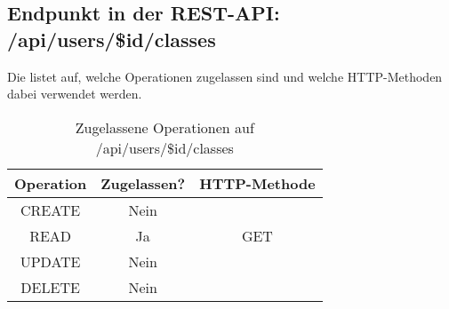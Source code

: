 \subsection{Endpunkt in der REST-API: /api/users/\$id/classes}
Die  listet auf, welche Operationen zugelassen sind und welche HTTP-Methoden dabei verwendet werden. 

\begin{table}[!htbp]
	\begin{tabular}{|c|c|c|}
		\hline
			\textbf{Operation} & \textbf{Zugelassen?} & \textbf{HTTP-Methode} \\ \hline
			CREATE & Nein &  \\ \hline 
			READ & Ja & GET \\ \hline
			UPDATE & Nein & \\ \hline 
			DELETE & Nein & \\ \hline
	\end{tabular}

		\caption{Zugelassene Operationen auf /api/users/\$id/classes}
		\label{tab:rest:api:users:id:classes:meth}
\end{table}

